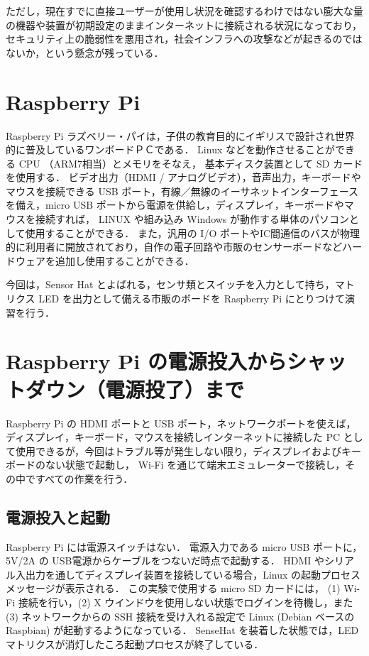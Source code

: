 \documentclass[11pt,a4,epsf]{report}
\begin{document}
ただし，現在すでに直接ユーザーが使用し状況を確認するわけではない膨大な量の機器や装置が初期設定のままインターネットに接続される状況になっており，
セキュリティ上の脆弱性を悪用され，社会インフラへの攻撃などが起きるのではないか，という懸念が残っている．

\section{Raspberry Pi}

Raspberry Pi ラズベリー・パイは，子供の教育目的にイギリスで設計され世界的に普及しているワンボードＰＣである．
Linux などを動作させることができる CPU （ARM7相当）とメモリをそなえ， 基本ディスク装置として SD カードを使用する．
ビデオ出力（HDMI / アナログビデオ），音声出力，キーボードやマウスを接続できる USB ポート，有線／無線のイーサネットインターフェースを備え，micro USB ポートから電源を供給し，ディスプレイ，キーボードやマウスを接続すれば，
LINUX や組み込み Windows が動作する単体のパソコンとして使用することができる．
また，汎用の I/O ポートやIC間通信のバスが物理的に利用者に開放されており，自作の電子回路や市販のセンサーボードなどハードウェアを追加し使用することができる．

今回は，Sensor Hat  とよばれる，センサ類とスイッチを入力として持ち，マトリクス LED を出力として備える市販のボードを Raspberry Pi にとりつけて演習を行う．


\section{Raspberry Pi の電源投入からシャットダウン（電源投了）まで}

Raspberry Pi の HDMI ポートと USB ポート，ネットワークポートを使えば，ディスプレイ，キーボード，マウスを接続しインターネットに接続した PC として使用できるが，今回はトラブル等が発生しない限り，ディスプレイおよびキーボードのない状態で起動し，
Wi-Fi を通じて端末エミュレーターで接続し，その中ですべての作業を行う．

\subsection{電源投入と起動}

Raspberry Pi には電源スイッチはない．
電源入力である micro USB ポートに，5V/2A の USB電源からケーブルをつないだ時点で起動する．
HDMI やシリアル入出力を通してディスプレイ装置を接続している場合，Linux の起動プロセスメッセージが表示される．
この実験で使用する micro SD カードには， (1)  Wi-Fi 接続を行い，(2) X ウインドウを使用しない状態でログインを待機し，また (3) ネットワークからの SSH 接続を受け入れる設定で Linux (Debian ベースの Raspbian) が起動するようになっている．
SenseHat を装着した状態では，LED マトリクスが消灯したころ起動プロセスが終了している．
\end{document}
